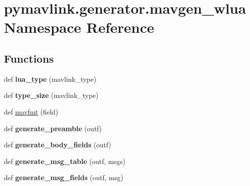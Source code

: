 \hypertarget{namespacepymavlink_1_1generator_1_1mavgen__wlua}{}\section{pymavlink.\+generator.\+mavgen\+\_\+wlua Namespace Reference}
\label{namespacepymavlink_1_1generator_1_1mavgen__wlua}
\subsection*{Functions}
\begin{DoxyCompactItemize}
\item 
\mbox{\label{namespacepymavlink_1_1generator_1_1mavgen__wlua_a2f87dcc75f8b9a6b8b417bf387b1a224}} 
def {\bfseries lua\+\_\+type} (mavlink\+\_\+type)
\item 
\mbox{\label{namespacepymavlink_1_1generator_1_1mavgen__wlua_aaced6c6a179f60dbd142ca923718ab12}} 
def {\bfseries type\+\_\+size} (mavlink\+\_\+type)
\item 
def \hyperlink{namespacepymavlink_1_1generator_1_1mavgen__wlua_a1007bc04078ec16dd974ffb4cbb23475}{mavfmt} (field)
\item 
\mbox{\label{namespacepymavlink_1_1generator_1_1mavgen__wlua_ae446521d9f00c70028d9cb99443108b2}} 
def {\bfseries generate\+\_\+preamble} (outf)
\item 
\mbox{\label{namespacepymavlink_1_1generator_1_1mavgen__wlua_a370d0ccb6cf4e13152f5e241b6d8b7d8}} 
def {\bfseries generate\+\_\+body\+\_\+fields} (outf)
\item 
\mbox{\label{namespacepymavlink_1_1generator_1_1mavgen__wlua_aab77022f5146a6676fe580ef01a92f92}} 
def {\bfseries generate\+\_\+msg\+\_\+table} (outf, msgs)
\item 
\mbox{\label{namespacepymavlink_1_1generator_1_1mavgen__wlua_a5a9d333c1ab8267705564a52bc232871}} 
def {\bfseries generate\+\_\+msg\+\_\+fields} (outf, msg)

\end{DoxyCompactItemize}
